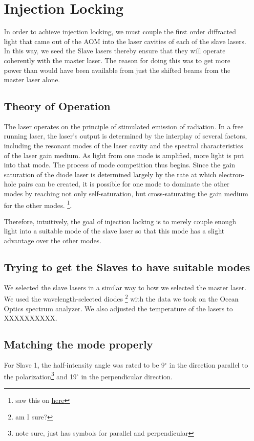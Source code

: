  \chapter{Injection Locking}


In order to achieve injection locking, we must couple the first order diffracted light that came out of the AOM into the laser cavities of each of the slave lasers. In this way, we seed the Slave lasers thereby ensure that they will operate coherently with the master laser. 
The reason for doing this was to get more power than would have been available from just the shifted beams from the master laser alone. 

\section{Theory of Operation}


The laser operates on the principle of stimulated emission of radiation. In a free running laser, the laser's output is determined by the interplay of several factors, including the resonant modes of the laser cavity and the spectral characteristics of the laser gain medium. As light from one mode is amplified, more light is put into that mode. The process of mode competition thus begins. Since the gain saturation of the diode laser is determined largely by the rate at which electron-hole pairs can be created, it is possible for one mode to dominate the other modes by reaching not only self-saturation, but cross-saturating the gain medium for the other modes. \footnote{saw this on \href{<http://www.rp-photonics.com/gain_saturation.html>}{here}}. 

Therefore, intuitively, the goal of injection locking is to merely couple enough light into a suitable mode of the slave laser so that this mode has a slight advantage over the other modes. 

\section{Trying to get the Slaves to have suitable modes}

We selected the slave lasers in a similar way to how we selected the master laser. We used the wavelength-selected diodes \footnote{am I sure?} with the data we took on the Ocean Optics spectrum analyzer. We also adjusted the temperature of the lasers to XXXXXXXXXX.

\section{Matching the mode properly}

For Slave 1, the half-intensity angle was rated to be 9$^\circ$ in the direction parallel to the polarization\footnote{note sure, just has symbols for parallel and perpendicular} and 19$^\circ$ in the perpendicular direction. 




